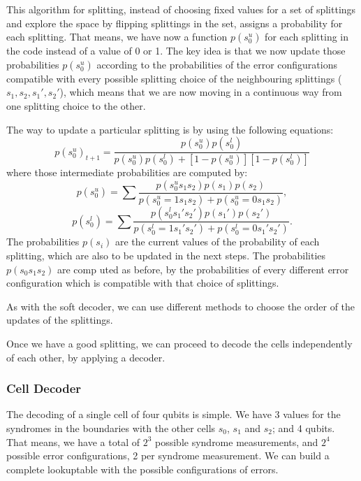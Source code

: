 \documentclass[a4paper,12pt]{article}
\begin{document}
This algorithm for splitting, instead of choosing fixed values for a set of splittings and explore the space by flipping splittings in the set, assigns a probability for each splitting. That means, we have now a function $p(s_0^u)$ for each splitting in the code instead of a value of 0 or 1. The key idea is that we now update those probabilities $p(s_0^u)$ according to the probabilities of the error configurations compatible with every possible splitting choice of the neighbouring splittings ($s_1,s_2,s_1',s_2'$), which means that we are now moving in a continuous way from one splitting choice to the other. 

The way to update a particular splitting is by using the following equations:
\begin{equation}
p(s_0^u)_{t+1}= \frac{p(s_0^u)p(s_0^l)}{p(s_0^u)p(s_0^l)+[1-p(s_0^u)][1-p(s_0^l)]}
\end{equation}
where those intermediate probabilities are computed by:
\begin{equation}
p(s_0^u)=\sum \frac{p(s_0^us_1s_2)p(s_1)p(s_2)}{p(s_0^u=1s_1s_2)+p(s_0^u=0s_1s_2)},
\end{equation}
\begin{equation}
p(s_0^l)=\sum \frac{p(s_0^ls_1's_2')p(s_1')p(s_2')}{p(s_0^l=1s_1's_2')+p(s_0^l=0s_1's_2')}.
\end{equation}
The probabilities $p(s_i)$ are the current values of the probability of each splitting, which are also to be updated in the next steps. The probabilities $p(s_0s_1s_2)$ are comp
uted as before, by the probabilities of every different error configuration which is compatible with that choice of splittings.

As with the soft decoder, we can use different methods to choose the order of the updates of the splittings.


Once we have a good splitting, we can proceed to decode the cells independently of each other, by applying a decoder.

\subsubsection{Cell Decoder}

The decoding of a single cell of four qubits is simple. We have 3 values for the syndromes in the boundaries with the other cells $s_0$, $s_1$ and $s_2$; and 4 qubits. That means, we have a total of $2^3$ possible syndrome measurements, and $2^4$ possible error configurations, 2 per syndrome measurement. We can build a complete lookuptable with the possible configurations of errors.
\end{document}
